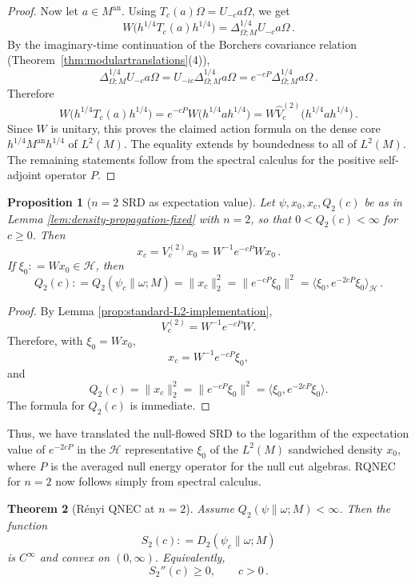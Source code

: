 \documentclass[11pt,a4paper]{article}
\theoremstyle{plain}
\newtheorem{theorem}{Theorem}
\numberwithin{theorem}{section}
\newtheorem{proposition}[theorem]{Proposition}
\theoremstyle{definition}
\newcommand{\?}{\overset{?}{=}}
\newcommand{\defeq}{\mathrel{\mathop:}=}
\newcommand{\I}{\infty}
\begin{document}
\begin{appendix}
\begin{proof}
Now let \(a \in M^{\mathrm{an}}\). Using \(T_c(a)\Omega = U_{-c} a \Omega\), we get
\[
W\big(h^{1/4} T_c(a) h^{1/4}\big)
=
\Delta_{\Omega;M}^{1/4} U_{-c} a \Omega\,.
\]
By the imaginary-time continuation of the Borchers covariance relation (Theorem~\ref{thm:modulartranslations}(4)),
\[
\Delta_{\Omega;M}^{1/4} U_{-c} a \Omega
=
U_{-ic} \Delta_{\Omega;M}^{1/4} a \Omega
=
e^{-cP} \Delta_{\Omega;M}^{1/4} a \Omega\,.
\]
Therefore
\[
W\big(h^{1/4} T_c(a) h^{1/4}\big)
=
e^{-cP} W\big(h^{1/4} a h^{1/4}\big)
=
W \widehat{V}_c^{(2)}\big(h^{1/4} a h^{1/4}\big)\,.
\]
Since \(W\) is unitary, this proves the claimed action formula on the dense core $h^{1/4}M^{\text{an}}h^{1/4}$ of $L^2(M)$. The equality extends by boundedness to all of $L^2(M)$. The remaining statements follow
from the spectral calculus for the positive self-adjoint operator \(P\).
\end{proof}

\begin{proposition}[\(n=2\) SRD as expectation value]
\label{prop:xc-semigroup-orbit}
Let $\psi,x_0,x_c, Q_2(c)$ be as in Lemma \ref{lem:density-propagation-fixed} with $n=2$, so that $0<Q_2(c)<\I$ for $c\geq0$. 
Then
\[
x_c = V_c^{(2)} x_0 = W^{-1} e^{-cP} W x_0\,.
\]
If \(\xi_0  \defeq  W x_0 \in \mathcal H\), then
\[
Q_2(c)  \defeq  Q_2(\psi_c\|\omega;M)
=
\|x_c\|_2^2
=
\|e^{-cP}\xi_0\|^2
=
\langle \xi_0, e^{-2cP}\xi_0\rangle_{\mathcal H}\,.
\]
\end{proposition}

\begin{proof}
By Lemma \ref{prop:standard-L2-implementation},
\[
    V_c^{(2)}=W^{-1}e^{-cP}W.
\]
Therefore, with \(\xi_0=Wx_0\),
\[
    x_c=W^{-1}e^{-cP}\xi_0,
\]
and
\[
    Q_2(c)=\|x_c\|_2^2 = \|e^{-cP}\xi_0\|^2 = \langle \xi_0,e^{-2cP}\xi_0\rangle.
\]
The formula for \(Q_2(c)\) is immediate.
\end{proof}

Thus, we have translated the null-flowed SRD to the logarithm of the expectation value of $e^{-2cP}$ in the $\mathcal H$ representative $\xi_0$ of the $L^2(M)$ sandwiched density $x_0$, where $P$ is the averaged null energy operator for the null cut algebras. 
RQNEC for $n=2$ now follows simply from spectral calculus.
\begin{theorem}[R\'enyi QNEC at \(n=2\)]
\label{thm:RQNEC-alpha-two}
Assume \(Q_2(\psi\|\omega;M) < \infty\). Then the function
\[
S_2(c)  \defeq  D_2(\psi_c\|\omega;M)
\]
is \(C^\infty\) and convex on \((0,\infty)\). Equivalently,
\[
S_2''(c) \ge 0, \qquad c>0\,.
\]
\end{theorem}


\end{appendix}
\end{document}
